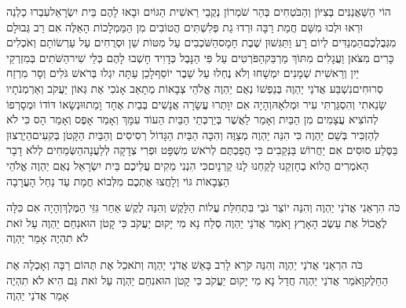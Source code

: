 \documentclass[../main/main.tex]{subfiles}
\begin{document}
\begin{multicols}{\ncols}
הוֹי הַשַּׁאֲנַנִּים בְּצִיּוֹן וְהַבֹּטְחִים בְּהַר שֹׁמְרוֹן נְקֻבֵי רֵאשִׁית הַגּוֹיִם וּבָאוּ לָהֶם בֵּית יִשְׂרָאֵל\PreVerseSpace{}עִבְרוּ כַלְנֵה וּרְאוּ וּלְכוּ מִשָּׁם חֲמַת רַבָּה וּרְדוּ גַת פְּלִשְׁתִּים הֲטוֹבִים מִן הַמַּמְלָכוֹת הָאֵלֶּה אִם רַב גְּבוּלָם מִגְּבֻלְכֶם\PreVerseSpace{}הַמְנַדִּים לְיוֹם רָע וַתַּגִּשׁוּן שֶׁבֶת חָמָס\PreVerseSpace{}הַשֹּׁכְבִים עַל מִטּוֹת שֵׁן וּסְרֻחִים עַל עַרְשׂוֹתָם וְאֹכְלִים כָּרִים מִצֹּאן וַעֲגָלִים מִתּוֹךְ מַרְבֵּק\PreVerseSpace{}הַפֹּרְטִים עַל פִּי הַנָּבֶל כְּדָוִיד חָשְׁבוּ לָהֶם כְּלֵי שִׁיר\PreVerseSpace{}הַשֹּׁתִים בְּמִזְרְקֵי יַיִן וְרֵאשִׁית שְׁמָנִים יִמְשָׁחוּ וְלֹא נֶחְלוּ עַל שֵׁבֶר יוֹסֵף\PreVerseSpace{}לָכֵן עַתָּה יִגְלוּ בְּרֹאשׁ גֹּלִים וְסָר מִרְזַח סְרוּחִים\PreVerseSpace{}נִשְׁבַּע אֲדֹנַי יַהְוֶה בְּנַפְשׁוֹ נְאֻם יַהְוֶה אֱלֹהֵי צְבָאוֹת מְתָאֵב אָנֹכִי אֶת גְּאוֹן יַעֲקֹב וְאַרְמְנֹתָיו שָׂנֵאתִי וְהִסְגַּרְתִּי עִיר וּמְלֹאָהּ\PreVerseSpace{}וְהָיָה אִם יִוָּתְרוּ עֲשָׂרָה אֲנָשִׁים בְּבַיִת אֶחָד וָמֵתוּ\PreVerseSpace{}וּנְשָׂאוֹ דּוֹדוֹ וּמְסָרְפוֹ לְהוֹצִיא עֲצָמִים מִן הַבַּיִת וְאָמַר לַאֲשֶׁר בְּיַרְכְּתֵי הַבַּיִת הַעוֹד עִמָּךְ וְאָמַר אָפֶס וְאָמַר הָס כִּי לֹא לְהַזְכִּיר בְּשֵׁם יַהְוֶה \ClosedSection{}כִּי הִנֵּה יַהְוֶה מְצַוֶּה וְהִכָּה הַבַּיִת הַגָּדוֹל רְסִיסִים וְהַבַּיִת הַקָּטֹן בְּקִעִים\PreVerseSpace{}הַיְרֻצוּן בַּסֶּלַע סוּסִים אִם יַחֲרוֹשׁ בַּנְּקֵבִים\SubEnd{} כִּי הֲפַכְתֶּם לְרֹאשׁ מִשְׁפָּט וּפְרִי צְדָקָה לְלַעֲנָה\PreVerseSpace{}הַשְּׂמֵחִים לְלֹא דָבָר הָאֹמְרִים הֲלוֹא בְחָזְקֵנוּ לָקַחְנוּ לָנוּ קַרְנָיִם\PreVerseSpace{}כִּי הִנְנִי מֵקִים עֲלֵיכֶם בֵּית יִשְׂרָאֵל נְאֻם יַהְוֶה אֱלֹהֵי הַצְּבָאוֹת גּוֹי וְלָחֲצוּ אֶתְכֶם מִלְּבוֹא חֲמָת עַד נַחַל הָעֲרָבָה\OpenSection{}\par
{}כֹּה הִרְאַנִי אֲדֹנַי יַהְוֶה וְהִנֵּה יוֹצֵר גֹּבַי בִּתְחִלַּת עֲלוֹת הַלָּקֶשׁ וְהִנֵּה לֶקֶשׁ אַחַר גִּזֵּי הַמֶּלֶךְ\PreVerseSpace{}וְהָיָה אִם כִּלָּה לֶאֱכוֹל אֶת עֵשֶׂב הָאָרֶץ וָאֹמַר אֲדֹנַי יַהְוֶה סְלַח נָא מִי יָקוּם יַעֲקֹב כִּי קָטֹן הוּא\PreVerseSpace{}נִחַם יַהְוֶה עַל זֹאת לֹא תִהְיֶה אָמַר יַהְוֶה\OpenSection{}\par
{}כֹּה הִרְאַנִי אֲדֹנַי יַהְוֶה וְהִנֵּה קֹרֵא לָרִב בָּאֵשׁ אֲדֹנַי יַהְוֶה וְתֹאכֵל\SubEnd{} אֶת תְּהוֹם רַבָּה וְאָכְלָה אֶת הַחֵלֶק\PreVerseSpace{}וָאֹמַר אֲדֹנַי יַהְוֶה חֲדַל נָא מִי יָקוּם יַעֲקֹב כִּי קָטֹן הוּא\PreVerseSpace{}נִחַם יַהְוֶה עַל זֹאת גַּם הִיא לֹא תִהְיֶה אָמַר אֲדֹנַי יַהְוֶה\OpenSection{}\par

\end{multicols}
\end{document}
